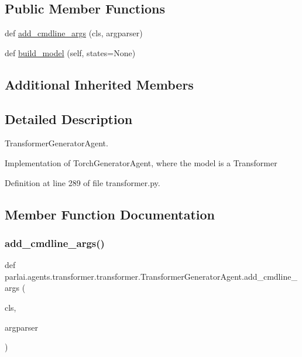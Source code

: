 \subsection*{Public Member Functions}
\begin{DoxyCompactItemize}
\item 
def \hyperlink{classparlai_1_1agents_1_1transformer_1_1transformer_1_1TransformerGeneratorAgent_a496b5ccc5efe17f290c37dc094ff74e8}{add\+\_\+cmdline\+\_\+args} (cls, argparser)
\item 
def \hyperlink{classparlai_1_1agents_1_1transformer_1_1transformer_1_1TransformerGeneratorAgent_a473f2a19d6bce412c4c9163c7beb9b09}{build\+\_\+model} (self, states=None)
\end{DoxyCompactItemize}
\subsection*{Additional Inherited Members}


\subsection{Detailed Description}
\begin{DoxyVerb}TransformerGeneratorAgent.

Implementation of TorchGeneratorAgent, where the model is a Transformer
\end{DoxyVerb}
 

Definition at line 289 of file transformer.\+py.



\subsection{Member Function Documentation}
\mbox{\label{classparlai_1_1agents_1_1transformer_1_1transformer_1_1TransformerGeneratorAgent_a496b5ccc5efe17f290c37dc094ff74e8}} 
\subsubsection{\texorpdfstring{add\+\_\+cmdline\+\_\+args()}{add\_cmdline\_args()}}
{\footnotesize\ttfamily def parlai.\+agents.\+transformer.\+transformer.\+Transformer\+Generator\+Agent.\+add\+\_\+cmdline\+\_\+args (\begin{DoxyParamCaption}\item[{}]{cls,  }\item[{}]{argparser }\end{DoxyParamCaption})}

